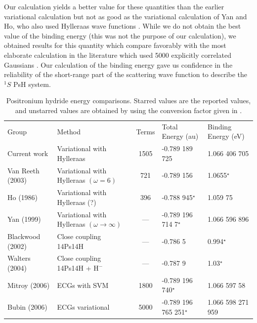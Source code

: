 \documentclass[preprint,showpacs,preprintnumbers,amsmath,amssymb]{revtex4}
\begin{document}
Our calculation yields a better value for these
quantities than the earlier variational calculation \cite{VanReeth2003,VanReeth2004}
but not as good as the variational calculation of
Yan and Ho, who also used Hylleraas wave functions \cite{Yan1999}.
While we do not obtain the best value of the binding energy
(this was not the purpose of our calculation),
we obtained results for this quantity which compare favorably with
the most elaborate calculation in the literature which
used 5000 explicitly correlated Gaussians \cite{Bubin2006}.
Our calculation of the binding energy gave us confidence
in the reliability of the short-range part of the
scattering wave function to describe
the $^1S$ PsH system.


\squeezetable  %
\begin{table}[H]
\begin{center}
\begin{ruledtabular}  %
\begin{tabular}{l l c l l}
Group & Method & Terms & Total Energy (au) & Binding Energy (eV)\\
\colrule
Current work & Variational with Hylleraas & 1505 & -0.789 189 725 & 1.066 406 705 \\
Van Reeth (2003) \cite{VanReeth2003} & Variational with Hylleraas $(\omega = 6)$ & 721 & -0.789 156 & 1.0655$^\star$ \\
Ho (1986) \cite{Ho1986} & Variational with Hylleraas (?) & 396 & -0.788 945$^\star$ & 1.059 75 \\
Yan (1999) \cite{Yan1999} & Variational with Hylleraas $(\omega \rightarrow \infty)$ & --- & -0.789 196 714 7$^\star$ & 1.066 596 896 \\
Blackwood (2002) \cite{Blackwood2002} & Close coupling 14Ps14H & --- & -0.786 5 & 0.994$^\star$ \\
Walters (2004) \cite{Walters2004} & Close coupling 14Ps14H + $\text{H}^-$ & --- & -0.787 9 & 1.03$^\star$\\
Mitroy (2006) \cite{Mitroy2006} & ECGs with SVM & 1800 & -0.789 196 740$^\star$ & 1.066 597 58 \\
Bubin (2006) \cite{Bubin2006} & ECGs variational & 5000 & -0.789 196 765 251$^\star$ & 1.066 598 271 959 \\
\end{tabular}
\end{ruledtabular}
\caption{Positronium hydride energy comparisons. Starred values are the reported values, and unstarred values are obtained by using the conversion factor given in \cite{NISTConversions}.}
\label{tab:BoundEnergy}
\end{center}
\end{table}
\end{document}
